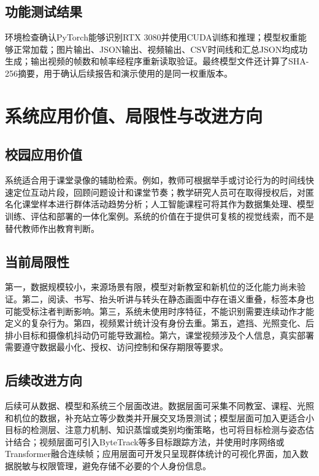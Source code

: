 \documentclass[12pt,hyperref,a4paper,UTF8]{ctexart}
\begin{document}
\subsection{功能测试结果}
环境检查确认PyTorch能够识别RTX 3080并使用CUDA训练和推理；模型权重能够正常加载；图片输出、JSON输出、视频输出、CSV时间线和汇总JSON均成功生成；输出视频的帧数和帧率经程序重新读取验证。最终模型文件还计算了SHA-256摘要，用于确认后续报告和演示使用的是同一权重版本。\par
\section{系统应用价值、局限性与改进方向}
\subsection{校园应用价值}
系统适合用于课堂录像的辅助检索。例如，教师可根据举手或讨论行为的时间线快速定位互动片段，回顾问题设计和课堂节奏；教学研究人员可在取得授权后，对匿名化课堂样本进行群体活动趋势分析；人工智能课程可将其作为数据集处理、模型训练、评估和部署的一体化案例。系统的价值在于提供可复核的视觉线索，而不是替代教师作出教育判断。\par
\subsection{当前局限性}
第一，数据规模较小，来源场景有限，模型对新教室和新机位的泛化能力尚未验证。第二，阅读、书写、抬头听讲与转头在静态画面中存在语义重叠，标签本身也可能受标注者判断影响。第三，系统未使用时序特征，不能识别需要连续动作才能定义的复杂行为。第四，视频累计统计没有身份去重。第五，遮挡、光照变化、后排小目标和摄像机抖动仍可能导致漏检。第六，课堂视频涉及个人信息，真实部署需要遵守数据最小化、授权、访问控制和保存期限等要求。\par
\subsection{后续改进方向}
后续可从数据、模型和系统三个层面改进。数据层面可采集不同教室、课程、光照和机位的数据，补充站立等少数类并开展交叉场景测试；模型层面可加入更适合小目标的检测层、注意力机制、知识蒸馏或类别均衡策略，也可将目标检测与姿态估计结合；视频层面可引入ByteTrack等多目标跟踪方法，并使用时序网络或Transformer融合连续帧；应用层面可开发只呈现群体统计的可视化界面，加入数据脱敏与权限管理，避免存储不必要的个人身份信息。\par
\end{document}
